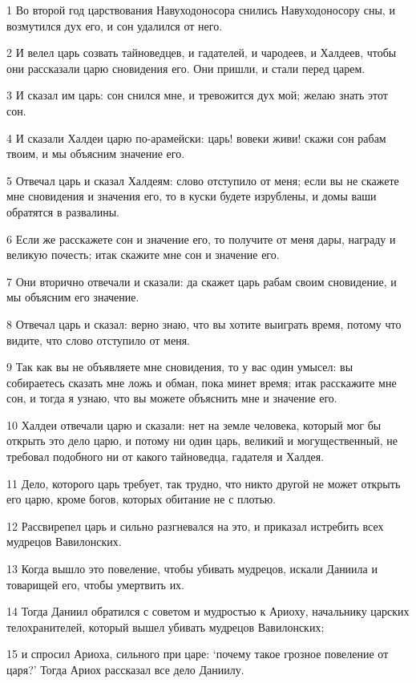 \par 1 Во второй год царствования Навуходоносора снились Навуходоносору сны, и возмутился дух его, и сон удалился от него.
\par 2 И велел царь созвать тайноведцев, и гадателей, и чародеев, и Халдеев, чтобы они рассказали царю сновидения его. Они пришли, и стали перед царем.
\par 3 И сказал им царь: сон снился мне, и тревожится дух мой; желаю знать этот сон.
\par 4 И сказали Халдеи царю по-арамейски: царь! вовеки живи! скажи сон рабам твоим, и мы объясним значение его.
\par 5 Отвечал царь и сказал Халдеям: слово отступило от меня; если вы не скажете мне сновидения и значения его, то в куски будете изрублены, и домы ваши обратятся в развалины.
\par 6 Если же расскажете сон и значение его, то получите от меня дары, награду и великую почесть; итак скажите мне сон и значение его.
\par 7 Они вторично отвечали и сказали: да скажет царь рабам своим сновидение, и мы объясним его значение.
\par 8 Отвечал царь и сказал: верно знаю, что вы хотите выиграть время, потому что видите, что слово отступило от меня.
\par 9 Так как вы не объявляете мне сновидения, то у вас один умысел: вы собираетесь сказать мне ложь и обман, пока минет время; итак расскажите мне сон, и тогда я узнаю, что вы можете объяснить мне и значение его.
\par 10 Халдеи отвечали царю и сказали: нет на земле человека, который мог бы открыть это дело царю, и потому ни один царь, великий и могущественный, не требовал подобного ни от какого тайноведца, гадателя и Халдея.
\par 11 Дело, которого царь требует, так трудно, что никто другой не может открыть его царю, кроме богов, которых обитание не с плотью.
\par 12 Рассвирепел царь и сильно разгневался на это, и приказал истребить всех мудрецов Вавилонских.
\par 13 Когда вышло это повеление, чтобы убивать мудрецов, искали Даниила и товарищей его, чтобы умертвить их.
\par 14 Тогда Даниил обратился с советом и мудростью к Ариоху, начальнику царских телохранителей, который вышел убивать мудрецов Вавилонских;
\par 15 и спросил Ариоха, сильного при царе: `почему такое грозное повеление от царя?' Тогда Ариох рассказал все дело Даниилу.

